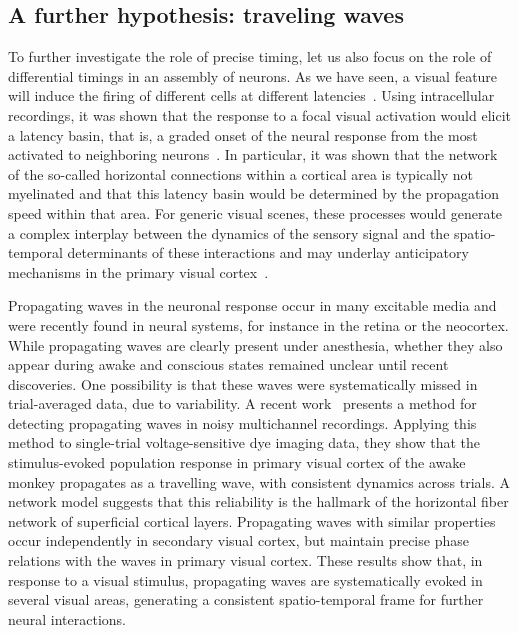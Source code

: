 \documentclass[brainsci, %
               review,submit,pdftex,moreauthors
               ]{Definitions/mdpi}
\begin{document}
\subsection{A further hypothesis: traveling waves}
%
To further investigate the role of precise timing, let us also focus on the role of differential timings in an assembly of neurons. As we have seen, a visual feature will induce the firing of different cells at different latencies~\citep{celebrini_dynamics_1993}. Using intracellular recordings, it was shown that the response to a focal visual activation would elicit a latency basin, that is, a graded onset of the neural response from the most activated to neighboring neurons~\citep{bringuier_horizontal_1999}. In particular, it was shown that the network of the so-called horizontal connections within a cortical area is typically not myelinated and that this latency basin would be determined by the propagation speed within that area. For generic visual scenes, these processes would generate a complex interplay between the dynamics of the sensory signal and the spatio-temporal determinants of these interactions and may underlay anticipatory mechanisms in the primary visual cortex~\citep{benvenuti_anticipatory_2020,le_bec_horizontal_2022}.
%

Propagating waves in the neuronal response occur in many excitable media and were recently found in neural systems, for instance in the retina or the neocortex. While propagating waves are clearly present under anesthesia, whether they also appear during awake and conscious states remained unclear until recent discoveries. One possibility is that these waves were systematically missed in trial-averaged data, due to variability. A recent work~\citep{muller_stimulus-evoked_2014} presents a method for detecting propagating waves in noisy multichannel recordings. Applying this method to single-trial voltage-sensitive dye imaging data, they show that the stimulus-evoked population response in primary visual cortex of the awake monkey propagates as a travelling wave, with consistent dynamics across trials. A network model suggests that this reliability is the hallmark of the horizontal fiber network of superficial cortical layers. Propagating waves with similar properties occur independently in secondary visual cortex, but maintain precise phase relations with the waves in primary visual cortex. These results show that, in response to a visual stimulus, propagating waves are systematically evoked in several visual areas, generating a consistent spatio-temporal frame for further neural interactions.
\end{document}
